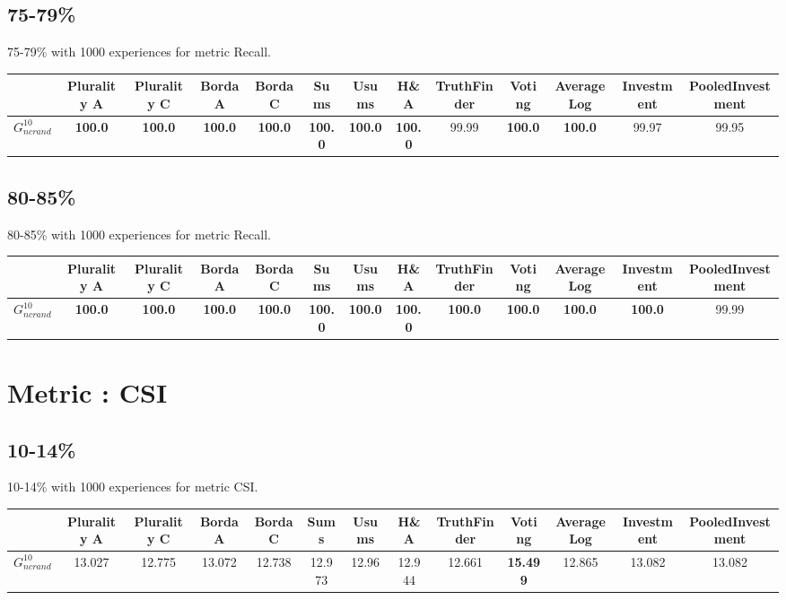 \documentclass{article}
\newcommand{\graph}[2]{$G_{#1}^{#2}$}
\begin{document}
\subsection{75-79\%}

75-79\% with 1000 experiences for metric Recall.

\noindent\begin{tabular}{|l|c|c|c|c|c|c|c|c|c|c|c|c|}
\hline
& Plurality A& Plurality C& Borda A& Borda C& Sums& Usums& H\&A& TruthFinder& Voting& AverageLog& Investment& PooledInvestment\\
\hline
\graph{ncrand}{10} &\textbf{100.0}&\textbf{100.0}&\textbf{100.0}&\textbf{100.0}&\textbf{100.0}&\textbf{100.0}&\textbf{100.0}&99.99&\textbf{100.0}&\textbf{100.0}&99.97&99.95\\
\hline
\end{tabular}
\newpage

\subsection{80-85\%}

80-85\% with 1000 experiences for metric Recall.

\noindent\begin{tabular}{|l|c|c|c|c|c|c|c|c|c|c|c|c|}
\hline
& Plurality A& Plurality C& Borda A& Borda C& Sums& Usums& H\&A& TruthFinder& Voting& AverageLog& Investment& PooledInvestment\\
\hline
\graph{ncrand}{10} &\textbf{100.0}&\textbf{100.0}&\textbf{100.0}&\textbf{100.0}&\textbf{100.0}&\textbf{100.0}&\textbf{100.0}&\textbf{100.0}&\textbf{100.0}&\textbf{100.0}&\textbf{100.0}&99.99\\
\hline
\end{tabular}
\newpage
\newpage
\section{Metric : CSI}

\newpage

\subsection{10-14\%}

10-14\% with 1000 experiences for metric CSI.

\noindent\begin{tabular}{|l|c|c|c|c|c|c|c|c|c|c|c|c|}
\hline
& Plurality A& Plurality C& Borda A& Borda C& Sums& Usums& H\&A& TruthFinder& Voting& AverageLog& Investment& PooledInvestment\\
\hline
\graph{ncrand}{10} &13.027&12.775&13.072&12.738&12.973&12.96&12.944&12.661&\textbf{15.499}&12.865&13.082&13.082\\
\hline
\end{tabular}
\newpage
\end{document}

